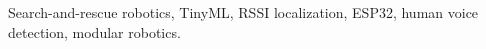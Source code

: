 \documentclass[conference]{IEEEtran}
\begin{document}
\begin{IEEEkeywords}
Search-and-rescue robotics, TinyML, RSSI localization, ESP32, human voice detection, modular robotics.
\end{IEEEkeywords}





















\end{document}
